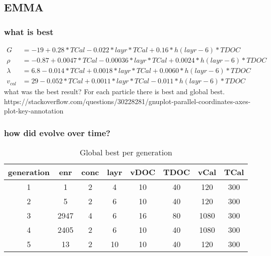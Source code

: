 \subsection{EMMA}
\subsubsection{what is best}
\begin{align}
    G &=      -19 + 0.28 * TCal  - 0.022 * layr*TCal  +  0.16 * h(layr-6)*TDOC \\
    \rho &=  -0.87 + 0.0047 * TCal  - 0.00036 * layr*TCal  +  0.0024 * h(layr-6)*TDOC \\
    \lambda &=  6.8 - 0.014 * TCal  + 0.0018 * layr*TCal  + 0.0060 * h(layr-6)*TDOC \\
    v_{cal} &= 29 - 0.052 * TCal  + 0.0011 * layr*TCal  -  0.011 * h(layr-6)*TDOC 
\end{align}
what was the best result? For each particle there is best and global best. 
https://stackoverflow.com/questions/30228281/gnuplot-parallel-coordinates-axes-plot-key-annotation

\subsubsection{how did evolve over time?}

\begin{table}[h]
	\centering
    \caption{Global best per generation}
	\label{tab:emma_gen}
	\begin{tabular}{cccccccc}
        \hline\hline
    generation  &enr &conc &layr &vDOC &TDOC &vCal &TCal\\
        \hline
     1   &1       &2    &4   &10   &40  &120  &300\\
     2   &5       &2    &6   &10   &40  &120  &300\\
     3   &2947    &4    &6   &16   &80 &1080  &300\\
     4   &2405    &2    &6   &10   &40 &1080  &300\\
     5   &13      &2   &10   &10   &40  &120  &300\\
    \hline\hline
	\end{tabular}
\end{table}

